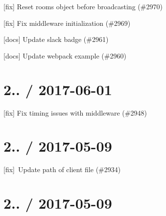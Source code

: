 
\begin{DoxyItemize}
\item \mbox{[}fix\mbox{]} Reset rooms object before broadcasting (\#2970)
\item \mbox{[}fix\mbox{]} Fix middleware initialization (\#2969)
\item \mbox{[}docs\mbox{]} Update slack badge (\#2961)
\item \mbox{[}docs\mbox{]} Update webpack example (\#2960)
\end{DoxyItemize}

\section*{2.. / 2017-\/06-\/01 }


\begin{DoxyItemize}
\item \mbox{[}fix\mbox{]} Fix timing issues with middleware (\#2948)
\end{DoxyItemize}

\section*{2.. / 2017-\/05-\/09 }


\begin{DoxyItemize}
\item \mbox{[}fix\mbox{]} \+Update path of client file (\#2934)
\end{DoxyItemize}

\section*{2.. / 2017-\/05-\/09 }


